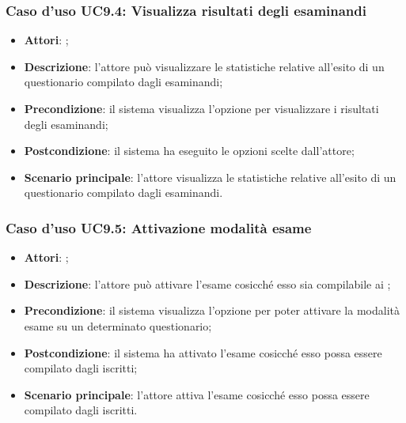 	\subsubsection{Caso d'uso UC9.4: Visualizza risultati degli esaminandi}
	\label{UC9.4}
	\begin{itemize}
		\item \textbf{Attori}: \uaupro{};
		\item \textbf{Descrizione}: l'attore può visualizzare le statistiche relative all'esito di un  questionario compilato dagli esaminandi;
		\item \textbf{Precondizione}: il sistema visualizza l'opzione per visualizzare i risultati degli esaminandi;
		\item \textbf{Postcondizione}: il sistema ha eseguito le opzioni scelte dall'attore;
		\item \textbf{Scenario principale}: l'attore visualizza le statistiche relative all'esito di un questionario compilato dagli esaminandi. 
	\end{itemize}
		
	\subsubsection{Caso d'uso UC9.5: Attivazione modalità esame}
	\label{UC9.5}
	\begin{itemize}
		\item \textbf{Attori}: \uaupro{};
		\item \textbf{Descrizione}: l'attore può attivare l'esame cosicché esso sia compilabile ai \uaus{};
		\item \textbf{Precondizione}: il sistema visualizza l'opzione per poter attivare la modalità esame su un determinato questionario;
		\item \textbf{Postcondizione}: il sistema ha attivato l'esame cosicché esso possa essere compilato dagli \uaus{} iscritti;
		\item \textbf{Scenario principale}: l'attore attiva l'esame cosicché esso possa essere compilato dagli \uaus{} iscritti.
	\end{itemize}
										
